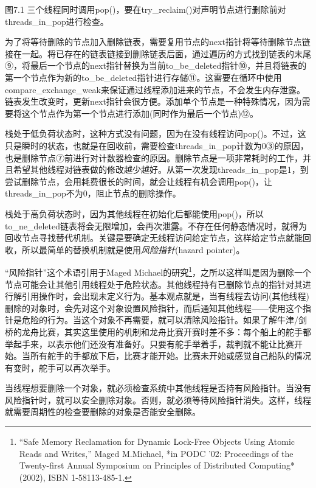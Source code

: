 图7.1 三个线程同时调用pop()，要在try\_reclaim()对声明节点进行删除前对threads\_in\_pop进行检查。

为了将等待删除的节点加入删除链表，需要复用节点的next指针将等待删除节点链接在一起。将已存在的链表链接到删除链表后面，通过遍历的方式找到链表的末尾⑨，将最后一个节点的next指针替换为当前to\_be\_deleted指针⑩，并且将链表的第一个节点作为新的to\_be\_deleted指针进行存储⑪。这需要在循环中使用compare\_exchange\_weak来保证通过线程添加进来的节点，不会发生内存泄露。链表发生改变时，更新next指针会很方便。添加单个节点是一种特殊情况，因为需要将这个节点作为第一个节点进行添加(同时作为最后一个节点)⑫。

栈处于低负荷状态时，这种方式没有问题，因为在没有线程访问pop()。不过，这只是瞬时的状态，也就是在回收前，需要检查threads\_in\_pop计数为0③的原因，也是删除节点⑦前进行对计数器检查的原因。删除节点是一项非常耗时的工作，并且希望其他线程对链表做的修改越少越好。从第一次发现threads\_in\_pop是1，到尝试删除节点，会用耗费很长的时间，就会让线程有机会调用pop()，让threads\_in\_pop不为0，阻止节点的删除操作。

栈处于高负荷状态时，因为其他线程在初始化后都能使用pop()，所以to\_ne\_deleted链表将会无限增加，会再次泄露。不存在任何静态情况时，就得为回收节点寻找替代机制。关键是要确定无线程访问给定节点，这样给定节点就能回收，所以最简单的替换机制就是使用\textit{风险指针}(hazard pointer)。


“风险指针”这个术语引用于Maged Michael的研究\footnote[1]{“Safe Memory Reclamation for Dynamic Lock-Free Objects Using Atomic Reads and Writes,” Maged M.Michael, *in PODC ’02: Proceedings of the Twenty-first Annual Symposium on Principles of Distributed Computing* (2002), ISBN 1-58113-485-1.}，之所以这样叫是因为删除一个节点可能会让其他引用线程处于危险状态。其他线程持有已删除节点的指针对其进行解引用操作时，会出现未定义行为。基本观点就是，当有线程去访问(其他线程)删除的对象时，会先对这个对象设置风险指针，而后通知其他线程——使用这个指针是危险的行为。当这个对象不再需要，就可以清除风险指针。如果了解牛津/剑桥的龙舟比赛，其实这里使用的机制和龙舟比赛开赛时差不多：每个船上的舵手都举起手来，以表示他们还没有准备好。只要有舵手举着手，裁判就不能让比赛开始。当所有舵手的手都放下后，比赛才能开始。比赛未开始或感觉自己船队的情况有变时，舵手可以再次举手。

当线程想要删除一个对象，就必须检查系统中其他线程是否持有风险指针。当没有风险指针时，就可以安全删除对象。否则，就必须等待风险指针消失。这样，线程就需要周期性的检查要删除的对象是否能安全删除。

